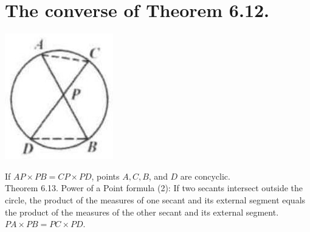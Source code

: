\documentclass[10pt]{article}
\begin{document}
\section*{The converse of Theorem 6.12.}
\begin{center}
\includegraphics[max width=\textwidth]{2025_04_17_97bc1f7e44d93c271a88g-192(1)}
\end{center}

If \(A P \times P B=C P \times P D\), points \(A, C, B\), and \(D\) are concyclic.\\
Theorem 6.13. Power of a Point formula (2): If two secants intersect outside the circle, the product of the measures of one secant and its external segment equals the product of the measures of the other secant and its external segment.\\
\(P A \times P B=P C \times P D\).
\end{document}
